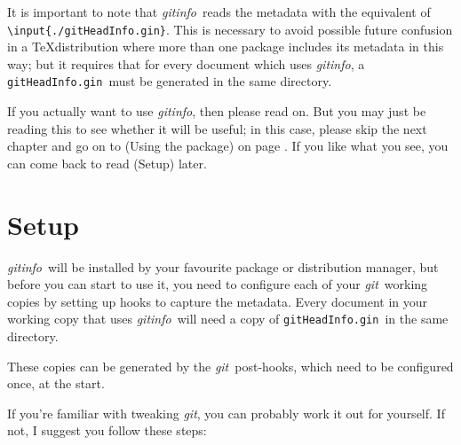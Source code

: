 \documentclass[a4paper,12pt,twoside,openany]{memoir}
\newcommand{\sfit}[1]{\textit{#1}}
\newcommand{\git}{\sfit{git}}
\newcommand{\tpname}{\sfit{gitinfo}}
\newcommand{\ginname}{gitHeadInfo.gin}
\newcommand{\metaname}{\texttt{\ginname}}
\begin{document}
It is important to note that \tpname\ reads the metadata
with the equivalent of \texttt{\textbackslash input\{./\ginname\}}.
This is necessary to avoid possible future confusion in a
\TeX distribution where more than one package includes its
metadata in this way; but it requires that for every document which
uses \tpname, a \metaname\ must be generated in the same directory. 

If you actually want to use \tpname, then please read on.
But you may just be reading this to see whether it will be useful;
in this case,
please skip the next chapter and go on to (Using the package)
on page \pageref{ch:using}.
If you like what you see, you can come back to
read (Setup) later. 
\chapter{Setup}
\tpname\ will be installed by your favourite package or distribution manager,
but before you can start to use it,
you need to configure each of your \git\ working copies
by setting up hooks to capture the metadata.
Every document in your working copy that uses \tpname\
will need a copy of \metaname\ in the same directory.

These copies can be generated by the \git\ post-hooks,
which need to be configured once, at the start.

If you're familiar with tweaking \git, you can probably work it out for yourself.
If not, I suggest you follow these steps:
\end{document}
